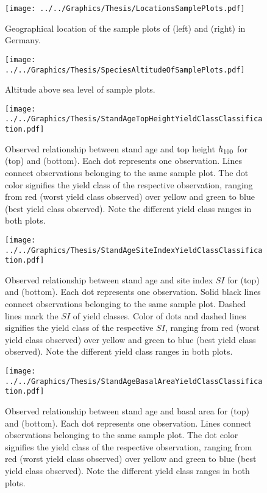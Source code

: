 \begin{figure}[H]
  \centering
  \texttt{[image: ../../Graphics/Thesis/LocationsSamplePlots.pdf]}
  \caption{Geographical location of the sample plots of \Beech{} (left) and \Spruce{} (right) in Germany.}
  \label{fig:LocationsSamplePlots}
\end{figure}

\begin{figure}[H]
  \centering
  \texttt{[image: ../../Graphics/Thesis/SpeciesAltitudeOfSamplePlots.pdf]}
  \caption{Altitude above sea level of sample plots.}
  \label{fig:SpeciesAltitudeOfSamplePlots}
\end{figure}

\newpage{}
\begin{figure}[H]
  \centering
  \texttt{[image: ../../Graphics/Thesis/StandAgeTopHeightYieldClassClassification.pdf]}
  \caption{Observed relationship between stand age and top height \(h_{100}\) for \Beech{} (top) and \Spruce{} (bottom).  Each dot represents one observation.  Lines connect observations belonging to the same sample plot.  The dot color signifies the yield class of the respective observation, ranging from red (worst yield class observed) over yellow and green to blue (best yield class observed).  Note the different yield class ranges in both plots.}
  \label{fig:StandAgeTopHeightYieldClassClassification}
\end{figure}

\newpage{}
\begin{figure}[H]
  \centering
  \texttt{[image: ../../Graphics/Thesis/StandAgeSiteIndexYieldClassClassification.pdf]}
  \caption{Observed relationship between stand age and site index \(SI\) for \Beech{} (top) and \Spruce{} (bottom).  Each dot represents one observation.  Solid black lines connect observations belonging to the same sample plot.  Dashed lines mark the \(SI\) of yield classes.  Color of dots and dashed lines signifies the yield class of the respective \(SI\), ranging from red (worst yield class observed) over yellow and green to blue (best yield class observed).  Note the different yield class ranges in both plots.}
  \label{fig:StandAgeSiteIndexYieldClassClassification}
\end{figure}

\newpage{}
\begin{figure}[H]
  \centering
  \texttt{[image: ../../Graphics/Thesis/StandAgeBasalAreaYieldClassClassification.pdf]}
  \caption{Observed relationship between stand age and basal area for \Beech{} (top) and \Spruce{} (bottom).  Each dot represents one observation.  Lines connect observations belonging to the same sample plot.  The dot color signifies the yield class of the respective observation, ranging from red (worst yield class observed) over yellow and green to blue (best yield class observed).  Note the different yield class ranges in both plots.}
  \label{fig:StandAgeBasalAreaYieldClassClassification}
\end{figure}

